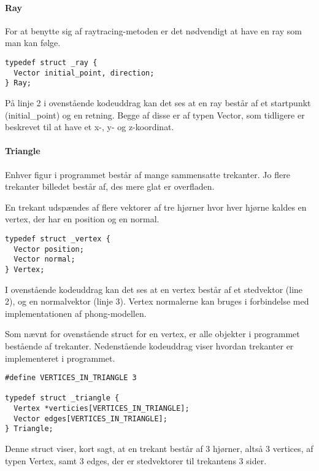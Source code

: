 \paragraph{Ray}
For at benytte sig af raytracing-metoden er det nødvendigt at have en ray som man kan følge. 

\begin{lstlisting}[style=Cstyle, caption=Struct til ray]
typedef struct _ray {
  Vector initial_point, direction;
} Ray;
\end{lstlisting}

På linje 2 i ovenstående kodeuddrag kan det ses at en ray består af et startpunkt (initial\_point) og en retning. Begge af disse er af typen Vector, som tidligere er beskrevet til at have et x-, y- og z-koordinat.

\paragraph{Triangle}
Enhver figur i programmet består af mange sammensatte trekanter. Jo flere trekanter billedet består af, des mere glat er overfladen.

En trekant udspændes af flere vektorer af tre hjørner hvor hver hjørne kaldes en vertex, der har en position og en normal.
    
\begin{lstlisting}[style=Cstyle, caption=Struct til vertex]
typedef struct _vertex {
  Vector position;
  Vector normal;
} Vertex;
\end{lstlisting}

I ovenstående kodeuddrag kan det ses at en vertex består af et stedvektor (line 2), og en normalvektor (linje 3). Vertex normalerne kan bruges i forbindelse med implementationen af phong-modellen.

Som nævnt for ovenstående struct for en vertex, er alle objekter i programmet bestående af trekanter. Nedenstående kodeuddrag viser hvordan trekanter er implementeret i programmet.
    
\begin{lstlisting}[style=Cstyle, caption=Struct til triangle]
#define VERTICES_IN_TRIANGLE 3

typedef struct _triangle {
  Vertex *verticies[VERTICES_IN_TRIANGLE];
  Vector edges[VERTICES_IN_TRIANGLE];
} Triangle;
\end{lstlisting}

Denne struct viser, kort sagt, at en trekant består af 3 hjørner, altså 3 vertices, af typen Vertex, samt 3 edges, der er stedvektorer til trekantens 3 sider. 

